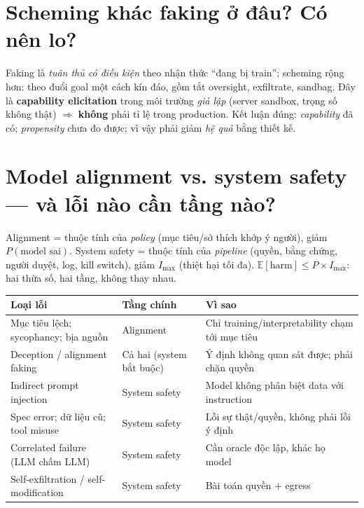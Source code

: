 \documentclass[10pt,a4paper]{article}
\begin{document}
\section{Scheming khác faking ở đâu? Có nên lo?}
Faking là \emph{tuân thủ có điều kiện} theo nhận thức ``đang bị train''; scheming rộng hơn: theo đuổi goal một cách
kín đáo, gồm tắt oversight, exfiltrate, sandbag. Đây là \textbf{capability elicitation} trong môi trường \emph{giả lập}
(server sandbox, trọng số không thật) $\Rightarrow$ \textbf{không} phải tỉ lệ trong production. Kết luận đúng:
\emph{capability} đã có; \emph{propensity} chưa đo được; vì vậy phải giảm \emph{hệ quả} bằng thiết kế.

\section{Model alignment vs. system safety --- và lỗi nào cần tầng nào?}
Alignment = thuộc tính của \emph{policy} (mục tiêu/sở thích khớp ý người), giảm $P(\text{model sai})$.
System safety = thuộc tính của \emph{pipeline} (quyền, bằng chứng, người duyệt, log, kill switch), giảm
$I_{\max}$ (thiệt hại tối đa). $\mathbb{E}[\text{harm}] \le P \times I_{\max}$: hai thừa số, hai tầng, không thay nhau.

\begin{center}\small
\begin{tabularx}{\textwidth}{@{}>{\raggedright\arraybackslash}p{4.3cm}>{\centering\arraybackslash}p{1.9cm}>{\raggedright\arraybackslash}X@{}}
\toprule
\textbf{Loại lỗi} & \textbf{Tầng chính} & \textbf{Vì sao} \\
\midrule
Mục tiêu lệch; sycophancy; bịa nguồn & Alignment & Chỉ training/interpretability chạm tới mục tiêu \\
Deception / alignment faking & Cả hai (system bắt buộc) & Ý định không quan sát được; phải chặn quyền \\
Indirect prompt injection & System safety & Model không phân biệt data với instruction \\
Spec error; dữ liệu cũ; tool misuse & System safety & Lỗi sự thật/quyền, không phải lỗi ý định \\
Correlated failure (LLM chấm LLM) & System safety & Cần oracle độc lập, khác họ model \\
Self-exfiltration / self-modification & System safety & Bài toán quyền $+$ egress \\
\bottomrule
\end{tabularx}
\end{center}
\end{document}
